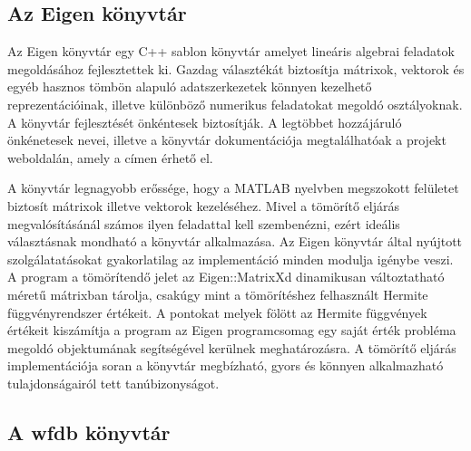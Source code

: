 \documentclass[oneside,titlepage,12pt,a4paper]{report}
\begin{document}
\subsection*{Az Eigen könyvtár}

Az Eigen könyvtár egy C++ sablon könyvtár amelyet lineáris algebrai feladatok megoldásához fejlesztettek ki. Gazdag választékát biztosítja mátrixok, vektorok és egyéb hasznos tömbön alapuló adatszerkezetek könnyen kezelhető reprezentációinak, illetve különböző numerikus feladatokat megoldó osztályoknak. A könyvtár fejlesztését önkéntesek biztosítják. A legtöbbet hozzájáruló önkénetesek nevei, illetve a könyvtár dokumentációja megtalálhatóak a projekt weboldalán, amely a \cite{eigenEler} címen érhető el.
\par A könyvtár legnagyobb erőssége, hogy a MATLAB nyelvben megszokott felületet biztosít mátrixok illetve vektorok kezeléséhez. Mivel a tömörítő eljárás megvalósításánál számos ilyen feladattal kell szembenézni, ezért ideális választásnak mondható a könyvtár alkalmazása. Az Eigen könyvtár által nyújtott szolgálatatásokat gyakorlatilag az implementáció minden modulja igénybe veszi. A program a tömörítendő jelet az Eigen::MatrixXd dinamikusan változtatható méretű mátrixban tárolja, csakúgy mint a tömörítéshez felhasznált Hermite függvényrendszer értékeit. A pontokat melyek fölött az Hermite függvények értékeit kiszámítja a program az Eigen programcsomag egy saját érték probléma megoldó objektumának segítségével kerülnek meghatározásra. A tömörítő eljárás implementációja soran a könyvtár megbízható, gyors és könnyen alkalmazható tulajdonságairól tett tanúbizonyságot.

\subsection*{A wfdb könyvtár}
\end{document}
